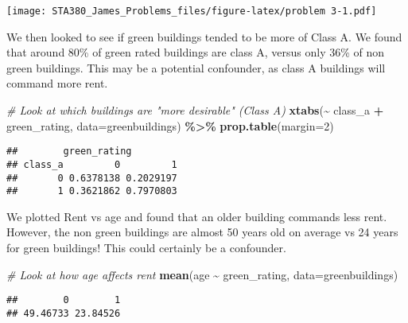 \documentclass[
]{article}
\newenvironment{Shaded}{\begin{snugshade}}{\end{snugshade}}
\newcommand{\AttributeTok}[1]{\textcolor[rgb]{0.13,0.29,0.53}{#1}}
\newcommand{\CommentTok}[1]{\textcolor[rgb]{0.56,0.35,0.01}{\textit{#1}}}
\newcommand{\DecValTok}[1]{\textcolor[rgb]{0.00,0.00,0.81}{#1}}
\newcommand{\FunctionTok}[1]{\textcolor[rgb]{0.13,0.29,0.53}{\textbf{#1}}}
\newcommand{\NormalTok}[1]{#1}
\newcommand{\SpecialCharTok}[1]{\textcolor[rgb]{0.81,0.36,0.00}{\textbf{#1}}}
\begin{document}
\texttt{[image: STA380\_James\_Problems\_files/figure-latex/problem 3-1.pdf]}

We then looked to see if green buildings tended to be more of Class A.
We found that around 80\% of green rated buildings are class A, versus
only 36\% of non green buildings. This may be a potential confounder, as
class A buildings will command more rent.

\begin{Shaded}
\begin{Highlighting}[]
\CommentTok{\# Look at which buildings are "more desirable" (Class A)}
\FunctionTok{xtabs}\NormalTok{(}\SpecialCharTok{\textasciitilde{}}\NormalTok{ class\_a }\SpecialCharTok{+}\NormalTok{ green\_rating, }\AttributeTok{data=}\NormalTok{greenbuildings) }\SpecialCharTok{\%\textgreater{}\%}
  \FunctionTok{prop.table}\NormalTok{(}\AttributeTok{margin=}\DecValTok{2}\NormalTok{)}
\end{Highlighting}
\end{Shaded}

\begin{verbatim}
##        green_rating
## class_a         0         1
##       0 0.6378138 0.2029197
##       1 0.3621862 0.7970803
\end{verbatim}

We plotted Rent vs age and found that an older building commands less
rent. However, the non green buildings are almost 50 years old on
average vs 24 years for green buildings! This could certainly be a
confounder.

\begin{Shaded}
\begin{Highlighting}[]
\CommentTok{\# Look at how age affects rent}
\FunctionTok{mean}\NormalTok{(age }\SpecialCharTok{\textasciitilde{}}\NormalTok{ green\_rating, }\AttributeTok{data=}\NormalTok{greenbuildings)}
\end{Highlighting}
\end{Shaded}

\begin{verbatim}
##        0        1 
## 49.46733 23.84526
\end{verbatim}
\end{document}
